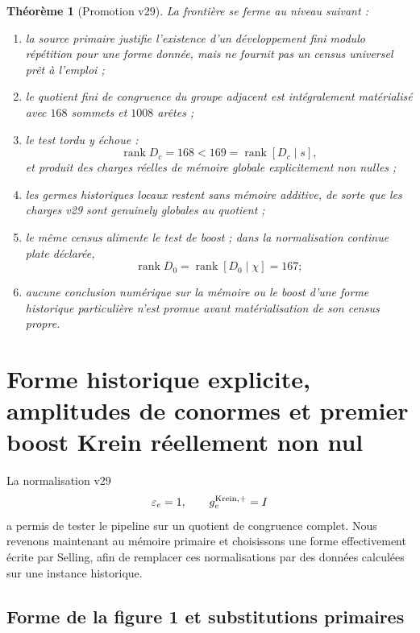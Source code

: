 \documentclass[11pt,a4paper]{article}
\newtheorem{theorem}{Théorème}[section]
\newcommand{\rank}{\operatorname{rank}}
\begin{document}
\begin{theorem}[Promotion v29]\label{thm:v29-verdict}
La frontière se ferme au niveau suivant :
\begin{enumerate}[label=\textup{(\roman*)}]
\item la source primaire justifie l'existence d'un développement fini modulo répétition pour une forme donnée, mais ne fournit pas un census universel prêt à l'emploi ;
\item le quotient fini de congruence du groupe adjacent est intégralement matérialisé avec $168$ sommets et $1008$ arêtes ;
\item le test tordu y échoue :
\[
 \rank D_c=168<169=\rank[D_c\mid s],
\]
et produit des charges réelles de mémoire globale explicitement non nulles ;
\item les germes historiques locaux restent sans mémoire additive, de sorte que les charges v29 sont genuinely globales au quotient ;
\item le même census alimente le test de boost ; dans la normalisation continue plate déclarée,
\[
 \rank D_0=\rank[D_0\mid\chi]=167;
\]
\item aucune conclusion numérique sur la mémoire ou le boost d'une forme historique particulière n'est promue avant matérialisation de son census propre.
\end{enumerate}
\end{theorem}


\section{Forme historique explicite, amplitudes de conormes et premier boost Krein réellement non nul}\label{sec:v30-explicit-selling-form}

La normalisation v29
\[
 \varepsilon_e=1,\qquad
 g_e^{\rm Krein,+}=I
\]
a permis de tester le pipeline sur un quotient de congruence complet. Nous revenons maintenant au mémoire primaire et choisissons une forme effectivement écrite par Selling, afin de remplacer ces normalisations par des données calculées sur une instance historique.

\subsection{Forme de la figure 1 et substitutions primaires}
\end{document}
